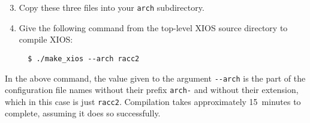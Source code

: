 \begin{enumerate}\setcounter{enumi}{2}
    \item Copy these three files into your \verb|arch| subdirectory.
    \item Give the following command from the top-level XIOS source directory to compile XIOS:
\begin{verbatim}
  $ ./make_xios --arch racc2
\end{verbatim}
\end{enumerate}

In the above command, the value given to the argument \verb|--arch| is the part of the configuration file names without their prefix \verb|arch-| and without their extension, which in this case is just \verb|racc2|.
Compilation takes approximately 15~minutes to complete, assuming it does so successfully.
